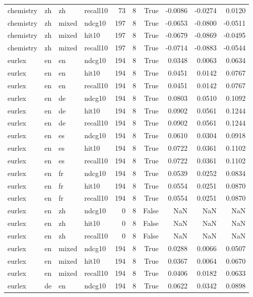 \begin{tabular}{llllrrrrrr}
chemistry & zh & zh & recall10 & 73 & 8 & True & -0.0086 & -0.0274 & 0.0120 \\
chemistry & zh & mixed & ndcg10 & 197 & 8 & True & -0.0653 & -0.0800 & -0.0511 \\
chemistry & zh & mixed & hit10 & 197 & 8 & True & -0.0679 & -0.0869 & -0.0495 \\
chemistry & zh & mixed & recall10 & 197 & 8 & True & -0.0714 & -0.0883 & -0.0544 \\
eurlex & en & en & ndcg10 & 194 & 8 & True & 0.0348 & 0.0063 & 0.0634 \\
eurlex & en & en & hit10 & 194 & 8 & True & 0.0451 & 0.0142 & 0.0767 \\
eurlex & en & en & recall10 & 194 & 8 & True & 0.0451 & 0.0142 & 0.0767 \\
eurlex & en & de & ndcg10 & 194 & 8 & True & 0.0803 & 0.0510 & 0.1092 \\
eurlex & en & de & hit10 & 194 & 8 & True & 0.0902 & 0.0561 & 0.1244 \\
eurlex & en & de & recall10 & 194 & 8 & True & 0.0902 & 0.0561 & 0.1244 \\
eurlex & en & es & ndcg10 & 194 & 8 & True & 0.0610 & 0.0304 & 0.0918 \\
eurlex & en & es & hit10 & 194 & 8 & True & 0.0722 & 0.0361 & 0.1102 \\
eurlex & en & es & recall10 & 194 & 8 & True & 0.0722 & 0.0361 & 0.1102 \\
eurlex & en & fr & ndcg10 & 194 & 8 & True & 0.0539 & 0.0252 & 0.0834 \\
eurlex & en & fr & hit10 & 194 & 8 & True & 0.0554 & 0.0251 & 0.0870 \\
eurlex & en & fr & recall10 & 194 & 8 & True & 0.0554 & 0.0251 & 0.0870 \\
eurlex & en & zh & ndcg10 & 0 & 8 & False & NaN & NaN & NaN \\
eurlex & en & zh & hit10 & 0 & 8 & False & NaN & NaN & NaN \\
eurlex & en & zh & recall10 & 0 & 8 & False & NaN & NaN & NaN \\
eurlex & en & mixed & ndcg10 & 194 & 8 & True & 0.0288 & 0.0066 & 0.0507 \\
eurlex & en & mixed & hit10 & 194 & 8 & True & 0.0367 & 0.0064 & 0.0670 \\
eurlex & en & mixed & recall10 & 194 & 8 & True & 0.0406 & 0.0182 & 0.0633 \\
eurlex & de & en & ndcg10 & 194 & 8 & True & 0.0622 & 0.0342 & 0.0898 \\

\end{tabular}
